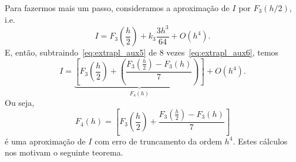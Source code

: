 Para fazermos mais um passo, consideramos a aproximação de $I$ por $F_3(h/2)$, i.e.
\begin{equation}\label{eq:extrapl_aux6}
  I = F_3\left(\frac{h}{2}\right) + k_3\frac{3h^3}{64} + O(h^4).
\end{equation}
E, então, subtraindo~\eqref{eq:extrapl_aux5} de $8$ vezes~\eqref{eq:extrapl_aux6}, temos
\begin{equation}
  I = \underbrace{\left[F_3\left(\frac{h}{2} \right)+ \left(\frac{F_3\left(\frac{h}{2}\right)-F_3(h)}{7}\right)\right]}_{F_4(h)} + O(h^4).
\end{equation}
Ou seja,
\begin{equation}
  F_4(h) = \left[F_3\left(\frac{h}{2}\right) + \frac{F_3\left(\frac{h}{2}\right)-F_3(h)}{7}\right]
\end{equation}
é uma aproximação de $I$ com erro de truncamento da ordem $h^4$. Estes cálculos nos motivam o seguinte teorema.

